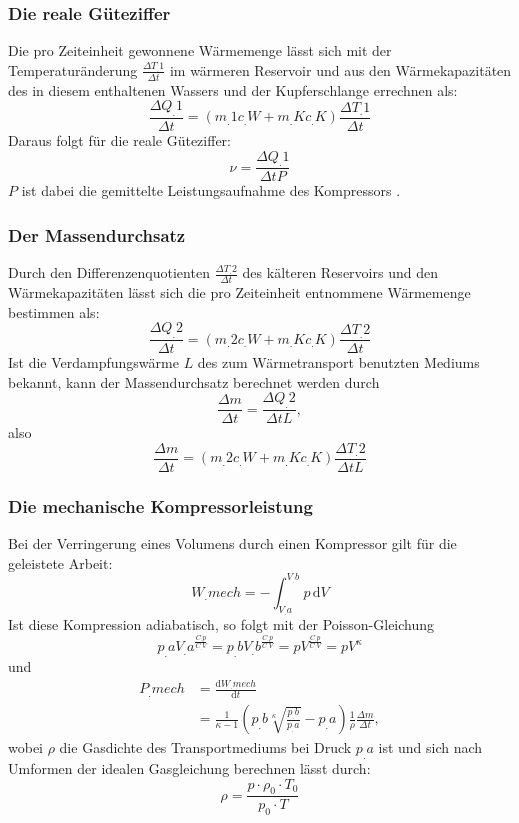\subsubsection{Die reale Güteziffer}
Die pro Zeiteinheit gewonnene Wärmemenge lässt sich mit der Temperaturänderung $\frac{\Delta T_.{1}}{\Delta t}$ im wärmeren Reservoir und aus den Wärmekapazitäten des in diesem enthaltenen Wassers und der Kupferschlange errechnen als\cite{V206}:
\begin{equation}
\frac{\Delta Q_.{1}}{\Delta t}=(m_.{1}c_.{W} +m_.{K}c_.{K})\frac{\Delta T_.{1}}{\Delta t}\label{eq:Q2/dt}
\end{equation}
Daraus folgt für die reale Güteziffer:
\begin{equation}
\nu = \frac{\Delta Q_.{1}}{\Delta t P}\label{eq:ny}
\end{equation}
$P$ ist dabei die gemittelte Leistungsaufnahme des Kompressors \cite{V206}.
\subsubsection{Der Massendurchsatz}
Durch den Differenzenquotienten $\frac{\Delta T_.{2}}{\Delta t}$
des kälteren Reservoirs und den Wärmekapazitäten lässt sich die pro Zeiteinheit entnommene Wärmemenge bestimmen als\cite{V206}:
\[\frac{\Delta Q_.{2}}{\Delta t}=(m_.{2}c_.{W} +m_.{K}c_.{K})\frac{\Delta T_.{2}}{\Delta t}\]
Ist die Verdampfungswärme $L$ des zum Wärmetransport benutzten Mediums bekannt, kann der Massendurchsatz berechnet werden durch
\begin{equation*}
\frac{\Delta m}{\Delta t} = \frac{\Delta Q_.{2}}{\Delta t L},\label{eq:Md1}
\end{equation*}
also
\begin{equation}
\frac{\Delta m}{\Delta t} = (m_.{2}c_.{W} +m_.{K}c_.{K})\frac{\Delta T_.{2}}{\Delta t L} \label{eq:Md2}
\end{equation}
\subsubsection{Die mechanische Kompressorleistung}
Bei der Verringerung eines Volumens durch einen Kompressor gilt für die geleistete Arbeit:
\[W_.{mech}= - \int_{V_.{a}}^{V_.{b}} p\,\mathrm{d}V\]
Ist diese Kompression adiabatisch, so folgt mit der Poisson-Gleichung
\[p_.{a}V_.{a}^{\frac{C_.{p}}{C_.{V}}} = p_.{b}V_.{b}^{\frac{C_.{p}}{C_.{V}}} = pV^{\frac{C_.{p}}{C_.{V}}} =pV^{\kappa}\]
und
\begin{align}
P_.{mech} 	&= \frac{\mathrm{d}W_.{mech}}{\mathrm{d}t} \nonumber\\
			&= \frac{1}{\kappa - 1}\left(p_.{b}\sqrt[\kappa]{\frac{p_.{b}}{p_.{a}}} - p_.{a}\right)\frac{1}{\rho}\frac{\Delta m}{\Delta t},\label{eq:P}
\end{align}
wobei $\rho$ die Gasdichte des Transportmediums bei Druck $p_.{a}$ ist und sich nach Umformen der idealen Gasgleichung berechnen lässt durch:
\begin{equation}
	\rho = \frac{p\cdot \rho_0\cdot T_0}{p_0\cdot T}\label{eq:rho}
\end{equation}